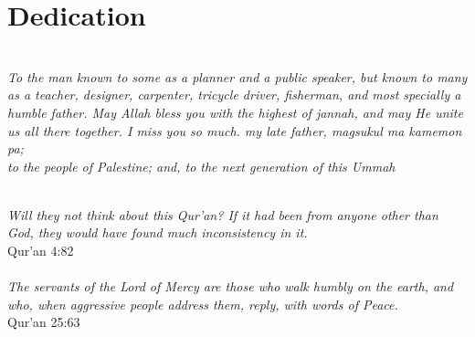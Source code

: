 \chapter*{Dedication}
\begin{center}
    \\

    \textit{To the man known to some as a planner and a public speaker, but known to many as a teacher, designer, carpenter, tricycle driver, fisherman, and most specially a humble father. May Allah bless you with the highest of jannah, and may He unite us all there together. I miss you so much. my late father, magsukul ma kamemon pa;\\to the people of Palestine; and, to the next generation of this Ummah}
    \begin{minipage}{.6\linewidth}
        \centering
        \vspace{4cm}
        \\
        \textit{Will they not think about this Qur'an? If it had been from anyone other than God, they would have found much inconsistency in it.}\\
        {\sc Qur'an 4:82}\\[3cm]
        \\
        \textit{The servants of the Lord of Mercy are those who walk humbly on the earth, and who, when aggressive people address them, reply, with words of Peace.}\\
        {\sc Qur'an 25:63}\\[1cm]
    \end{minipage}
\end{center}